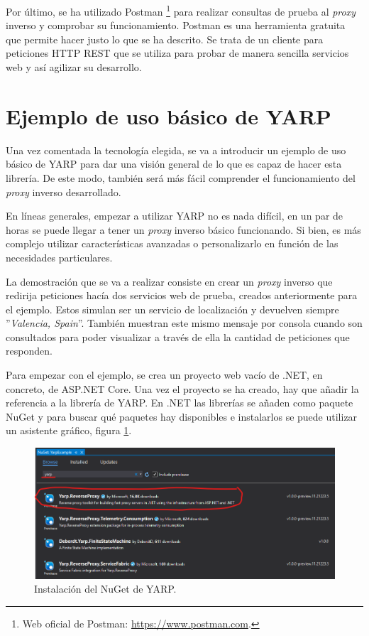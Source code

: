 \documentclass[11pt,spanish,listoffigures]{tfgetsinf}
\begin{document}
Por último, se ha utilizado Postman \footnote{Web oficial de Postman: \url{https://www.postman.com}.} para realizar consultas de prueba al \emph{proxy} inverso y comprobar su funcionamiento. Postman es una herramienta gratuita que permite hacer justo lo que se ha descrito. Se trata de un cliente para peticiones HTTP REST que se utiliza para probar de manera sencilla servicios web y así agilizar su desarrollo.


	\section{Ejemplo de uso básico de YARP} \label{ejemploUsoYARP}

Una vez comentada la tecnología elegida, se va a introducir un ejemplo de uso básico de YARP para dar una visión general de lo que es capaz de hacer esta librería. De este modo, también será más fácil comprender el funcionamiento del \emph{proxy} inverso desarrollado.

En líneas generales, empezar a utilizar YARP no es nada difícil, en un par de horas se puede llegar a tener un \emph{proxy} inverso básico funcionando. Si bien, es más complejo utilizar características avanzadas o personalizarlo en función de las necesidades particulares.

La demostración que se va a realizar consiste en crear un \emph{proxy} inverso que redirija peticiones hacía dos servicios web de prueba, creados anteriormente para el ejemplo. Estos simulan ser un servicio de localización y devuelven siempre ''\emph{Valencia, Spain}''. También muestran este mismo mensaje por consola cuando son consultados para poder visualizar a través de ella la cantidad de peticiones que responden.

Para empezar con el ejemplo, se crea un proyecto web vacío de .NET, en concreto, de ASP.NET Core. Una vez el proyecto se ha creado, hay que añadir la referencia a la librería de YARP. En .NET las librerías se añaden como paquete NuGet \cite{NuGet} y para buscar qué paquetes hay disponibles e instalarlos se puede utilizar un asistente gráfico, figura \ref{ejemploYARP_instalacionNuGet}.

\begin{figure}[ht]
\centering
\includegraphics[width=1\textwidth]{imagenes/ejemploYARP/instalacionNuGet}
\caption{Instalación del NuGet de YARP.}
	\label{ejemploYARP_instalacionNuGet}
\end{figure}
\end{document}

